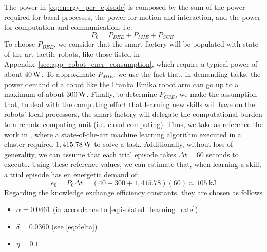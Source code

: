The power in \eqref{eq:energy_per_episode} is composed by the sum of the power required for basal processes, the power for motion and interaction, and the power for computation and communication; i.e.
\begin{equation}
    P_0 = P_{BEE}+P_{MIE} + P_{CCE}.
\end{equation}
To choose $P_{BEE}$, we consider that the smart factory will be populated with state-of-the-art tactile robots, like those listed in Appendix~\ref{sec:app_cobot_ener_consumption}, which require a typical power of about $\unit[40]{W}$. To approximate $P_{MIE}$, we use the fact that, in demanding tasks, the power demand of a cobot like the Franka Emika robot arm can go up to a maximum of about $ \unit[300] {W} $. Finally, to determine $P_{CCE}$, we make the assumption that, to deal with the computing effort that learning new skills will have on the robots' local processors, the smart factory will delegate the computational burden to a remote computing unit (i.e. cloud computing). Thus, we take as reference the work in \cite{Strubell2019EnergyAP}, where a state-of-the-art machine learning algorithm executed in a cluster required $\unit[1,415.78]{W}$ to solve a task. Additionally, without loss of generality, we can assume that each trial episode takes $\Delta t = 60$ seconds to execute. Using these reference values, we can estimate that, when learning a skill, a trial episode has en energetic demand of:
\begin{equation}
	e_0 = P_0 \Delta t = \left(40 + 300 + 1,415.78\right) \left(60\right) \approx 105~\text{kJ}
\end{equation}
Regarding the knowledge exchange efficiency constants, they are chosen as follows
\begin{itemize}
	\item $\alpha =  0.0461$ (in accordance to \eqref{eq:isolated_learning_rate})
	\item $\delta =  0.0360$ (see \eqref{eq:delta})
	\item $\eta= 0.1$
\end{itemize} 

